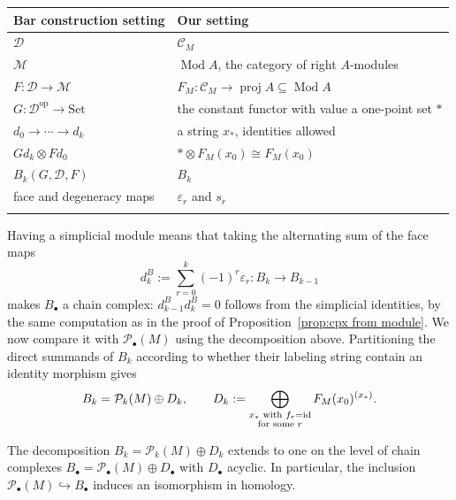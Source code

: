 \documentclass[a4paper,leqno]{amsart}
\begin{document}
\begin{center}
\begin{tabular}{p{}p{}}
\hline
Bar construction setting & Our setting\\
\hline
$\mathcal D$ & $\mathcal C_M$\\[3pt]
$\mathcal M$ & $\operatorname{Mod}A$, the category of right $A$-modules\\[3pt]
$F\colon\mathcal D\to\mathcal M$ & $F_M\colon\mathcal C_M\to\operatorname{proj}A\subseteq\operatorname{Mod}A$\\[3pt]
$G\colon\mathcal D^{\mathrm{op}}\to\mathrm{Set}$ & the constant functor with value a one-point set $\ast$\\[3pt]
$d_0\to\cdots\to d_k$ & a string $x_\ast$, identities allowed\\[3pt]
$Gd_k\otimes Fd_0$ & $\ast\otimes F_M(x_0)\cong F_M(x_0)$\\[3pt]
$B_k(G,\mathcal D,F)$ & $B_k$\\[3pt]
face and degeneracy maps & $\varepsilon_r$ and $s_r$\\
\hline\\[3pt]
\end{tabular}
\end{center}

Having a simplicial module means that taking the alternating sum of the face maps
\[
 d^B_k:=\sum_{r=0}^k(-1)^r\varepsilon_r\colon B_k\longrightarrow B_{k-1}
\]
makes $B_\bullet$ a chain complex: $d^B_{k-1}d^B_k=0$ follows from the simplicial identities, by the same computation as in the proof of Proposition~\ref{prop:cpx from module}. 
We now compare it with $\mathcal P_\bullet(M)$ using the decomposition above.
Partitioning the direct summands of $B_k$ according to whether their labeling string contain an identity morphism gives
\[
 B_k=\mathcal P_k(M)\oplus D_k,
 \qquad
 D_k:=\bigoplus_{\substack{x_\ast\text{ with }f_r=\operatorname{id}\\ \text{for some }r}}F_M(x_0)^{(x_\ast)}.
\]
\begin{prop}\label{prop:bar-construction-decomposition}
The decomposition $B_k=\mathcal P_k(M)\oplus D_k$ extends to one on the level of chain complexes $B_\bullet=\mathcal P_\bullet(M)\oplus D_\bullet$ with $D_\bullet$ acyclic.
In particular, the inclusion $\mathcal P_\bullet(M)\hookrightarrow B_\bullet$ induces an isomorphism in homology.
\end{prop}
\end{document}
